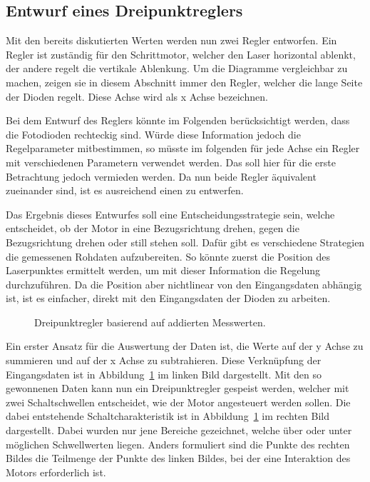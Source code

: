 \subsection{Entwurf eines Dreipunktreglers}

Mit den bereits diskutierten Werten werden nun zwei Regler entworfen.
Ein Regler ist zuständig für den Schrittmotor, welcher den Laser horizontal ablenkt, der andere regelt die vertikale Ablenkung.
Um die Diagramme vergleichbar zu machen, zeigen sie in diesem Abschnitt immer den Regler, welcher die lange Seite der Dioden regelt.
Diese Achse wird als x Achse bezeichnen.

Bei dem Entwurf des Reglers könnte im Folgenden berücksichtigt werden, dass die Fotodioden rechteckig sind.
Würde diese Information jedoch die Regelparameter mitbestimmen, so müsste im folgenden für jede Achse ein Regler mit verschiedenen Parametern verwendet werden.
Das soll hier für die erste Betrachtung jedoch vermieden werden.
Da nun beide Regler äquivalent zueinander sind, ist es ausreichend einen zu entwerfen.

Das Ergebnis dieses Entwurfes soll eine Entscheidungsstrategie sein, welche entscheidet, ob der Motor in eine Bezugsrichtung drehen, gegen die Bezugsrichtung drehen oder still stehen soll.
Dafür gibt es verschiedene Strategien die gemessenen Rohdaten aufzubereiten.
So könnte zuerst die Position des Laserpunktes ermittelt werden, um mit dieser Information die Regelung durchzuführen.
Da die Position aber nichtlinear von den Eingangsdaten abhängig ist, ist es einfacher, direkt mit den Eingangsdaten der Dioden zu arbeiten.

\begin{figure} \centering
	
	\caption{Dreipunktregler basierend auf addierten Messwerten.}
	\label{img:dreipunktreglerAdd}
\end{figure}

Ein erster Ansatz für die Auswertung der Daten ist, die Werte auf der y Achse zu summieren und auf der x Achse zu subtrahieren.
Diese Verknüpfung der Eingangsdaten ist in Abbildung~\ref{img:dreipunktreglerAdd} im linken Bild dargestellt.
Mit den so gewonnenen Daten kann nun ein Dreipunktregler gespeist werden, welcher mit zwei Schaltschwellen entscheidet, wie der Motor angesteuert werden sollen.
Die dabei entstehende Schaltcharakteristik ist in Abbildung~\ref{img:dreipunktreglerAdd} im rechten Bild dargestellt.
Dabei wurden nur jene Bereiche gezeichnet, welche über oder unter möglichen Schwellwerten liegen.
Anders formuliert sind die Punkte des rechten Bildes die Teilmenge der Punkte des linken Bildes, bei der eine Interaktion des Motors erforderlich ist.

